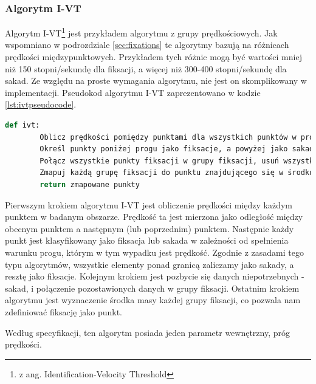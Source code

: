 \subsubsection{Algorytm I-VT}
\label{ssec:ivt}
Algorytm I-VT\footnote{z ang. Identification-Velocity Threshold} jest przykładem algorytmu z grupy prędkościowych. Jak wspomniano w podrozdziale \ref{sec:fixations} te algorytmy bazują na różnicach prędkości międzypunktowych. Przykładem tych różnic mogą być wartości mniej niż 150 stopni/sekundę dla fiksacji, a więcej niż 300-400 stopni/sekundę dla sakad. Ze względu na proste wymagania algorytmu, nie jest on skomplikowany w implementacji. Pseudokod algorytmu I-VT zaprezentowano w kodzie \ref{lst:ivtpseudocode}.
\begin{lstlisting}[language=Python, caption=Pseudokod algorytmu I-VT, label={lst:ivtpseudocode}]
    def ivt:
        Oblicz prędkości pomiędzy punktami dla wszystkich punktów w protokole
        Określ punkty poniżej progu jako fiksacje, a powyżej jako sakady
        Połącz wszystkie punkty fiksacji w grupy fiksacji, usuń wszystkie sakady
        Zmapuj każdą grupę fiksacji do punktu znajdującego się w środku każdej grupy
        return zmapowane punkty
\end{lstlisting}
Pierwszym krokiem algorytmu I-VT jest obliczenie prędkości między każdym punktem w badanym obszarze. Prędkość ta jest mierzona jako odległość między obecnym punktem a następnym (lub poprzednim) punktem. Następnie każdy punkt jest klasyfikowany jako fiksacja lub sakada w zależności od spełnienia warunku progu, którym w tym wypadku jest prędkość. Zgodnie z zasadami tego typu algorytmów, wszystkie elementy ponad granicą zaliczamy jako sakady, a resztę jako fiksacje. Kolejnym krokiem jest pozbycie się danych niepotrzebnych - sakad, i połączenie pozostawionych danych w grupy fiksacji. Ostatnim krokiem algorytmu jest wyznaczenie środka masy każdej grupy fiksacji, co pozwala nam zdefiniować fiksację jako punkt.\par
Według specyfikacji, ten algorytm posiada jeden parametr wewnętrzny, próg prędkości.
